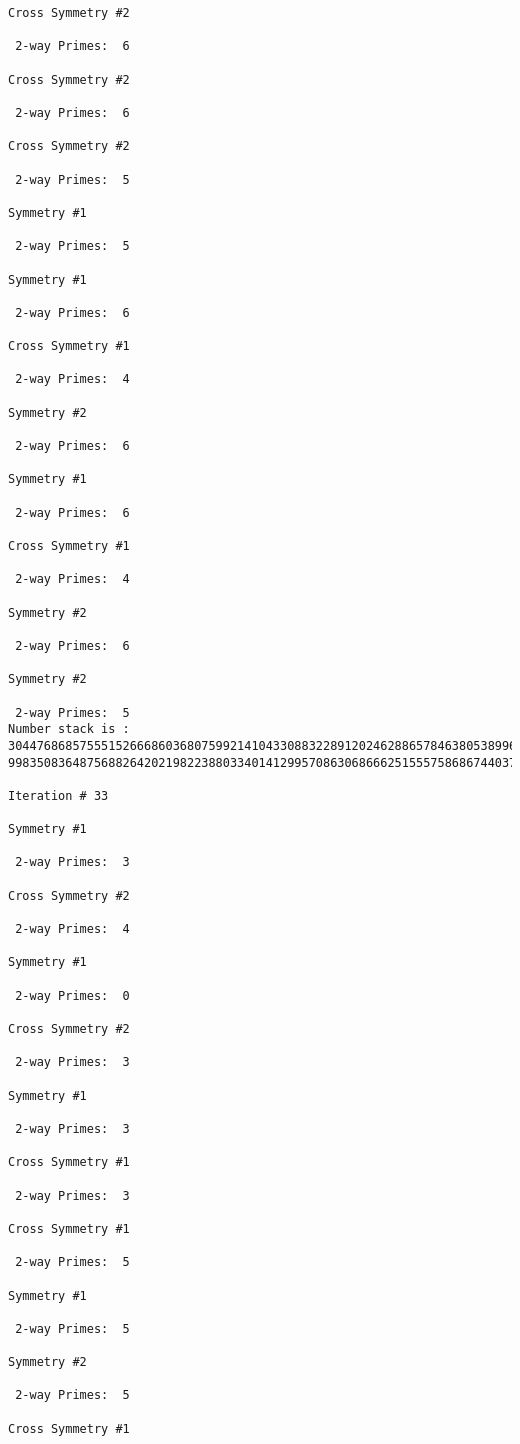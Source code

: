 \begin{verbatim}
Cross Symmetry #2

 2-way Primes: 	6

Cross Symmetry #2

 2-way Primes: 	6

Cross Symmetry #2

 2-way Primes: 	5

Symmetry #1

 2-way Primes: 	5

Symmetry #1

 2-way Primes: 	6

Cross Symmetry #1

 2-way Primes: 	4

Symmetry #2

 2-way Primes: 	6

Symmetry #1

 2-way Primes: 	6

Cross Symmetry #1

 2-way Primes: 	4

Symmetry #2

 2-way Primes: 	6

Symmetry #2

 2-way Primes: 	5
Number stack is :
30447686857555152666860368075992141043308832289120246288657846380538996794608835958544046240163340857
99835083648756882642021982238803340141299570863068666251555758686744037580433610426404458595388064976

Iteration #	33

Symmetry #1

 2-way Primes: 	3

Cross Symmetry #2

 2-way Primes: 	4

Symmetry #1

 2-way Primes: 	0

Cross Symmetry #2

 2-way Primes: 	3

Symmetry #1

 2-way Primes: 	3

Cross Symmetry #1

 2-way Primes: 	3

Cross Symmetry #1

 2-way Primes: 	5

Symmetry #1

 2-way Primes: 	5

Symmetry #2

 2-way Primes: 	5

Cross Symmetry #1


\end{verbatim}
